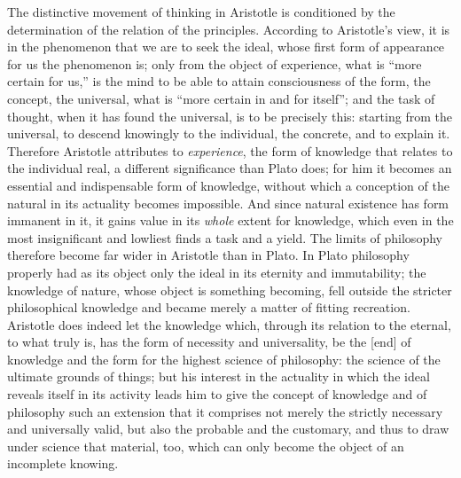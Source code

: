The distinctive movement of thinking in Aristotle is conditioned by the
determination of the relation of the principles. According to
Aristotle's view, it is in the phenomenon that we are to seek the ideal,
whose first form of appearance for us the phenomenon is; only from the
object of experience, what is ``more certain for us,'' is the mind to
be able to attain consciousness of the form, the concept, the
universal, what is ``more certain in and for itself''; and the task of
thought, when it has found the universal, is to be precisely
this: starting from the universal, to descend knowingly to the
individual, the concrete, and to explain it. Therefore Aristotle
attributes to \emph{experience}, the form of knowledge that relates to
the individual real, a different significance than Plato does; for him
it becomes an essential and indispensable form of knowledge, without
which a conception of the natural in its actuality becomes impossible.
And since natural existence has form immanent in it, it gains value in
its \emph{whole} extent for knowledge, which even in the most
insignificant and lowliest finds a task and a yield. The limits of
philosophy therefore become far wider in Aristotle than in Plato. In
Plato philosophy properly had as its object only the ideal in its
eternity and immutability; the knowledge of nature, whose object is
something becoming, fell outside the stricter philosophical knowledge
and became merely a matter of fitting recreation. Aristotle does indeed
let the knowledge which, through its relation to the eternal, to what
truly is, has the form of necessity and universality, be the
 [end] of knowledge and the form for the highest science of
philosophy: the science of the ultimate grounds of things; but his
interest in the actuality in which the ideal reveals itself in its
activity leads him to give the concept of knowledge and of philosophy
such an extension that it comprises not merely the strictly necessary
and universally valid, but also the probable and the customary, and
thus to draw under science that material, too, which can only become
the object of an incomplete knowing.

\divrule


